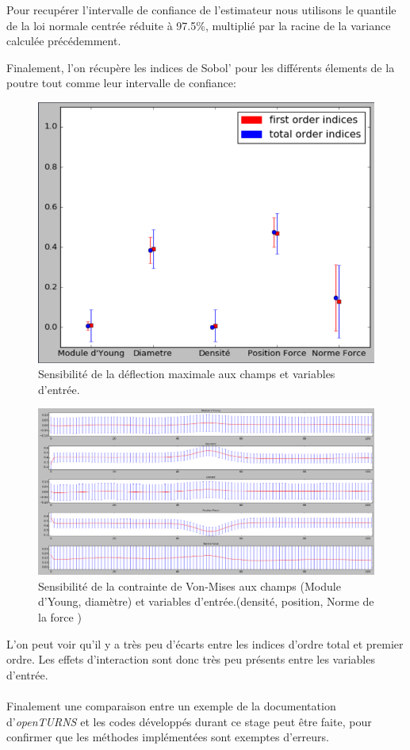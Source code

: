 \documentclass[a4paper,10pt]{article}
\begin{document}
Pour recupérer l'intervalle de confiance de l'estimateur nous utilisons le quantile de la loi normale centrée réduite à 97.5\%, multiplié par la racine de la variance calculée précédemment. 

Finalement, l'on récupère les indices de Sobol' pour les différents élements de la poutre tout comme leur intervalle de confiance: 



\begin{figure}[H]
   \centering   
   \includegraphics[scale=0.195]{sensibiliteDeflection10K.png}
      \caption{Sensibilité de la déflection maximale aux champs et variables d'entrée.}
         \label{MaxDeflec}
\end{figure}

\begin{figure}[H]
   \centering   
   \includegraphics[scale=0.255]{sensibiliteVonMises10K.png}
      \caption{Sensibilité de la contrainte de Von-Mises aux champs (Module d'Young, diamètre) et variables d'entrée.(densité, position, Norme de la force
      )}
         \label{MaxDeflec}
\end{figure}
L'on peut voir qu'il y a très peu d'écarts entre les indices d'ordre total et premier ordre. Les effets d'interaction sont donc très peu présents entre les variables d'entrée.\\
\\
Finalement une comparaison entre un exemple de la documentation d'\textit{openTURNS} et les codes développés durant ce stage peut être faite, pour confirmer que les méthodes implémentées sont exemptes d'erreurs. 
\end{document}
